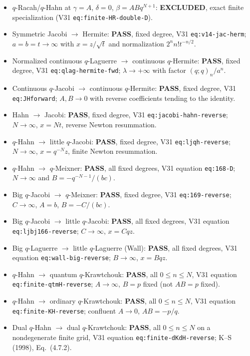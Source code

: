 \documentclass[11pt]{article}
\begin{document}
\begin{itemize}
\item $q$-Racah/$q$-Hahn at $\gamma=A$, $\delta=0$, $\beta=ABq^{N+1}$: \textbf{EXCLUDED}, exact finite specialization (V31 \texttt{eq:finite-HR-double-D}).
\item Symmetric Jacobi $\to$ Hermite: \textbf{PASS}, fixed degree, V31 \texttt{eq:v14-jac-herm}; $a=b=t\to\infty$ with $x=z/\sqrt t$ and normalization $2^nn!t^{-n/2}$.
\item Normalized continuous $q$-Laguerre $\to$ continuous $q$-Hermite: \textbf{PASS}, fixed degree, V31 \texttt{eq:qlag-hermite-fwd}; $\lambda\to+\infty$ with factor $(q;q)_n/a^n$.
\item Continuous $q$-Jacobi $\to$ continuous $q$-Hermite: \textbf{PASS}, fixed degree, V31 \texttt{eq:JHforward}; $A,B\to0$ with reverse coefficients tending to the identity.
\item Hahn $\to$ Jacobi: \textbf{PASS}, fixed degree, V31 \texttt{eq:jacobi-hahn-reverse}; $N\to\infty$, $x=Nt$, reverse Newton resummation.
\item $q$-Hahn $\to$ little $q$-Jacobi: \textbf{PASS}, fixed degree, V31 \texttt{eq:ljqh-reverse}; $N\to\infty$, $x=q^{-N}z$, finite Newton resummation.
\item $q$-Hahn $\to$ $q$-Meixner: \textbf{PASS}, all fixed degrees, V31 equation \texttt{eq:168-D}; $N\to\infty$ and $B=-q^{-N-1}/(bc)$.
\item Big $q$-Jacobi $\to$ $q$-Meixner: \textbf{PASS}, fixed degree, V31 \texttt{eq:169-reverse}; $C\to\infty$, $A=b$, $B=-C/(bc)$.
\item Big $q$-Jacobi $\to$ little $q$-Jacobi: \textbf{PASS}, all fixed degrees, V31 equation \texttt{eq:ljbj166-reverse}; $C\to\infty$, $x=Cqz$.
\item Big $q$-Laguerre $\to$ little $q$-Laguerre (Wall): \textbf{PASS}, all fixed degrees, V31 equation \texttt{eq:wall-big-reverse}; $B\to\infty$, $x=Bqz$.
\item $q$-Hahn $\to$ quantum $q$-Krawtchouk: \textbf{PASS}, all $0\le n\le N$, V31 equation \texttt{eq:finite-qtmH-reverse}; $A\to\infty$, $B=p$ fixed (not $AB=p$ fixed).
\item $q$-Hahn $\to$ ordinary $q$-Krawtchouk: \textbf{PASS}, all $0\le n\le N$, V31 equation \texttt{eq:finite-KH-reverse}; confluent $A\to0$, $AB=-p/q$.
\item Dual $q$-Hahn $\to$ dual $q$-Krawtchouk: \textbf{PASS}, all $0\le n\le N$ on a nondegenerate finite grid, V31 equation \texttt{eq:finite-dKdH-reverse}; K--S (1998), Eq.~(4.7.2).

\end{itemize}
\end{document}
